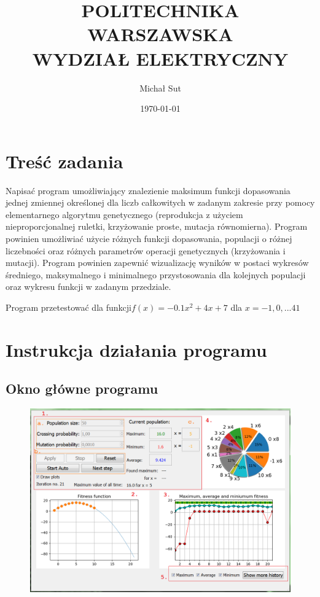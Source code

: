 \documentclass[a4paper,11pt]{article}
\title{POLITECHNIKA WARSZAWSKA \\ WYDZIAŁ ELEKTRYCZNY \\}
\author{Michał Sut}
\date{\today}
\begin{document}
	\thispagestyle{empty}
	\maketitle
	\date{}
	\section{Treść zadania}
	Napisać program umożliwiający znalezienie maksimum funkcji dopasowania jednej 
	zmiennej określonej dla liczb całkowitych w zadanym zakresie przy pomocy 
	elementarnego algorytmu genetycznego (reprodukcja z użyciem nieproporcjonalnej 
	ruletki, krzyżowanie proste, mutacja równomierna). Program powinien umożliwiać 
	użycie różnych funkcji dopasowania, populacji o różnej liczebności oraz różnych 
	parametrów operacji genetycznych (krzyżowania i mutacji). Program powinien 
	zapewnić wizualizację wyników w postaci wykresów średniego, maksymalnego 
	i minimalnego przystosowania dla kolejnych populacji oraz wykresu funkcji 
	w zadanym przedziale. 
	
	Program przetestować dla funkcji$ f(x)= -0.1x^2 + 4x + 7 $ dla $x= -1, 0, ... 41 $

	\section{Instrukcja działania programu}
		\subsection{Okno główne programu}
			\begin{figure}[H]
				\centering
				\includegraphics[scale=0.6]{main_window2.png}
			\end{figure}
		
\end{document}
